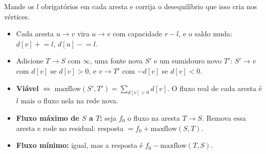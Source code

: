 Mande os $l$ obrigatórios em cada aresta e corrija o desequilíbrio que isso cria nos vértices.
\begin{itemize}
  \item Cada aresta $u \to v$ vira $u \to v$ com capacidade $r - l$, e o saldo muda: $d[v] \mathrel{+}= l$, $d[u] \mathrel{-}= l$.
  \item Adicione $T \to S$ com $\infty$, uma fonte nova $S'$ e um sumidouro novo $T'$: $S' \to v$ com $d[v]$ se $d[v] > 0$,
        e $v \to T'$ com $-d[v]$ se $d[v] < 0$.
  \item \textbf{Viável} $\iff$ $\text{maxflow}(S', T') = \sum_{d[v] > 0} d[v]$. O fluxo real de cada aresta é $l$ mais o fluxo
        nela na rede nova.
  \item \textbf{Fluxo máximo de $S$ a $T$:} seja $f_0$ o fluxo na aresta $T \to S$. Remova essa aresta e rode no residual:
        resposta $= f_0 + \text{maxflow}(S, T)$.
  \item \textbf{Fluxo mínimo:} igual, mas a resposta é $f_0 - \text{maxflow}(T, S)$.
\end{itemize}
